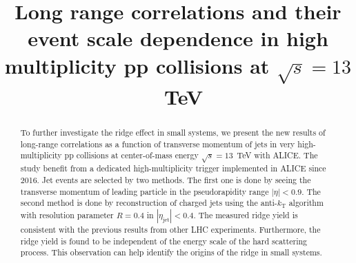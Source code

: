 \documentclass[ALICE,manyauthors]{cernphprep}
\begin{document}
\begin{titlepage}

\PHyear{}
\PHdate{\today}
%

\title{Long range correlations and their event scale dependence in high multiplicity pp collisions at $\sqrt{s} = 13$~TeV}


\begin{abstract}
%


To further investigate the ridge effect in small systems, we present the new results of long-range correlations as a function of transverse momentum of jets in very high-multiplicity pp collisions at center-of-mass energy $\sqrt{s} = 13$~TeV with ALICE. The study benefit from a dedicated high-multiplicity trigger implemented in ALICE since 2016. Jet events are selected by two methods. The first one is done by seeing the transverse momentum of  leading particle in the pseudorapidity range $|\eta|<0.9$. The second method is done by reconstruction of charged jets using the anti-$k_\mathrm{T}$ algorithm with resolution parameter $R=0.4$ in $|\eta_\mathrm{jet}|<0.4$. The measured ridge yield is consistent with the previous results from other LHC experiments. Furthermore, the ridge yield is found to be independent of the energy scale of the hard scattering process. This observation can help identify the origins of the ridge in small systems.


\end{abstract}

\end{titlepage}
\end{document}

